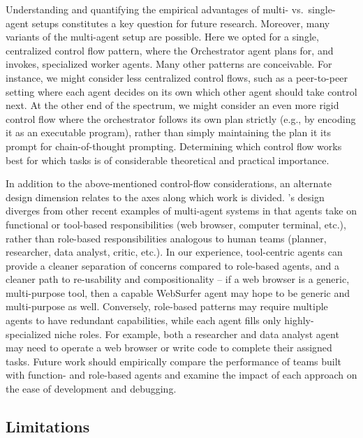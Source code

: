 Understanding and quantifying the empirical advantages of multi- vs.\ single-agent setups constitutes a key question for future research.
Moreover, many variants of the multi-agent setup are possible. Here we opted for a single, centralized control flow pattern, where the Orchestrator agent plans for, and invokes, specialized worker agents.
Many other patterns are conceivable.
For instance, we might consider less centralized control flows, such as a peer-to-peer setting where each agent decides on its own which other agent should take control next.
At the other end of the spectrum, we might consider an even more rigid control flow where the orchestrator follows its own plan strictly (e.g., by encoding it as an executable program), rather than simply maintaining the plan it its prompt for chain-of-thought prompting.
Determining which control flow works best for which tasks is of considerable theoretical and practical importance.
%

In addition to the above-mentioned control-flow considerations, an alternate design dimension relates to the axes along which work is divided. \team's design diverges from other recent examples of multi-agent systems in that agents take on functional or tool-based responsibilities (web browser, computer terminal, etc.), rather than role-based responsibilities analogous to human teams (planner, researcher, data analyst, critic, etc.). In our experience, tool-centric agents can provide a cleaner separation of concerns compared to role-based agents, and a cleaner path to re-usability and compositionality -- if a web browser is a generic, multi-purpose tool, then a capable WebSurfer agent may hope to be generic and multi-purpose as well. Conversely, role-based patterns may require multiple agents to have redundant capabilities, while each agent fills only highly-specialized niche roles. For example, both a researcher and data analyst agent may need to operate a web browser or write code to complete their assigned tasks. Future work should empirically compare the performance of teams built with function- and role-based agents and examine the impact of each approach on the ease of development and debugging.





\subsection{Limitations}
\label{sec:Limitations}

